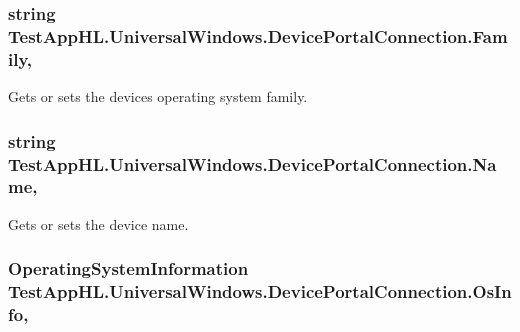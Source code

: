 \subsubsection[{\texorpdfstring{Family}{Family}}]{\setlength{\rightskip}{0pt plus 5cm}string Test\+App\+H\+L.\+Universal\+Windows.\+Device\+Portal\+Connection.\+Family\hspace{0.3cm}{\ttfamily [get]}, {\ttfamily [set]}}\hypertarget{class_test_app_h_l_1_1_universal_windows_1_1_device_portal_connection_aeb7782e5e3d3eb866205c8c53cc746a2}{}\label{class_test_app_h_l_1_1_universal_windows_1_1_device_portal_connection_aeb7782e5e3d3eb866205c8c53cc746a2}


Gets or sets the device\textquotesingle{}s operating system family. 

\subsubsection[{\texorpdfstring{Name}{Name}}]{\setlength{\rightskip}{0pt plus 5cm}string Test\+App\+H\+L.\+Universal\+Windows.\+Device\+Portal\+Connection.\+Name\hspace{0.3cm}{\ttfamily [get]}, {\ttfamily [set]}}\hypertarget{class_test_app_h_l_1_1_universal_windows_1_1_device_portal_connection_a88aeed82f8ded994e22b80b2fd0c5640}{}\label{class_test_app_h_l_1_1_universal_windows_1_1_device_portal_connection_a88aeed82f8ded994e22b80b2fd0c5640}


Gets or sets the device name. 

\subsubsection[{\texorpdfstring{Os\+Info}{OsInfo}}]{\setlength{\rightskip}{0pt plus 5cm}Operating\+System\+Information Test\+App\+H\+L.\+Universal\+Windows.\+Device\+Portal\+Connection.\+Os\+Info\hspace{0.3cm}{\ttfamily [get]}, {\ttfamily [set]}}\hypertarget{class_test_app_h_l_1_1_universal_windows_1_1_device_portal_connection_a9d88216506d3e4ba91b7d47adddc1139}{}\label{class_test_app_h_l_1_1_universal_windows_1_1_device_portal_connection_a9d88216506d3e4ba91b7d47adddc1139}


